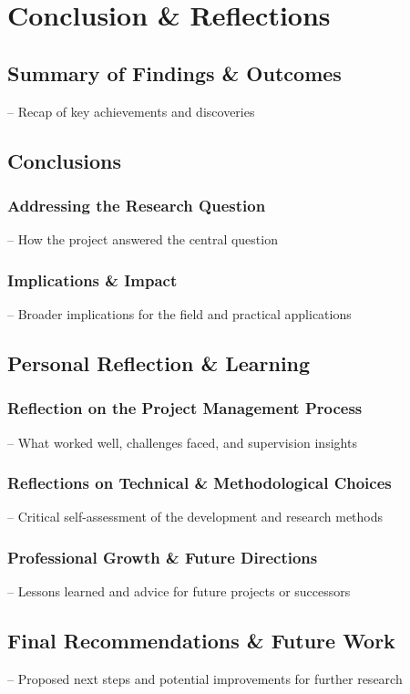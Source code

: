 \section{Conclusion \& Reflections}

\subsection{Summary of Findings \& Outcomes}
– Recap of key achievements and discoveries
\subsection{Conclusions}
\subsubsection{Addressing the Research Question}
– How the project answered the central question
\subsubsection{Implications \& Impact}
– Broader implications for the field and practical applications
\subsection{Personal Reflection \& Learning}
\subsubsection{Reflection on the Project Management Process}
– What worked well, challenges faced, and supervision insights
\subsubsection{Reflections on Technical \& Methodological Choices}
– Critical self-assessment of the development and research methods
\subsubsection{Professional Growth \& Future Directions}
– Lessons learned and advice for future projects or successors
\subsection{Final Recommendations \& Future Work}
– Proposed next steps and potential improvements for further research